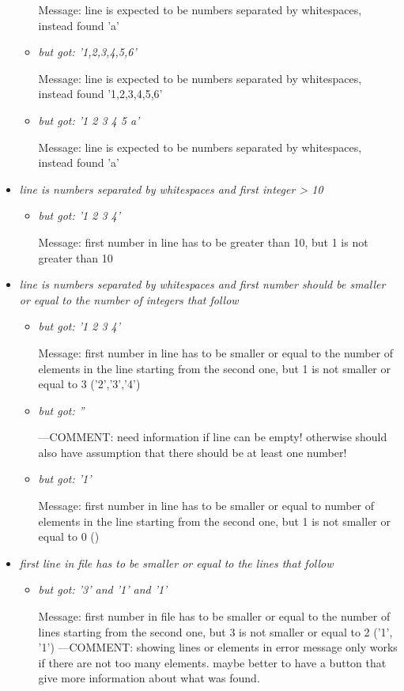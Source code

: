 \documentclass[11pt]{article}
\begin{document}
\begin{itemize}
\begin{itemize}
Message: line is expected to be numbers separated by whitespaces, instead found 'a'

\item \textit{but got: '1,2,3,4,5,6'}

Message: line is expected to be numbers separated by whitespaces, instead found '1,2,3,4,5,6'

\item \textit{but got: '1 2 3 4 5 a'}

Message: line is expected to be numbers separated by whitespaces, instead found 'a'
\end{itemize}

\item \textit{line is numbers separated by whitespaces and first integer > 10}
\begin{itemize}

\item \textit{but got: '1 2 3 4'}

Message: first number in line has to be greater than 10, but 1 is not greater than 10
\end{itemize}

\item \textit{line is numbers separated by whitespaces and first number should be smaller or equal to the number of integers that follow}
\begin{itemize}

\item \textit{but got: '1 2 3 4'}

Message: first number in line has to be smaller or equal to the number of elements in the line starting from the second one, but 1 is not smaller or equal to 3 ('2','3','4')

\item \textit{but got: ''}

---COMMENT: need information if line can be empty! otherwise should also have assumption that there should be at least one number!

\item \textit{but got: '1'}

Message: first number in line has to be smaller or equal to number of elements in the line starting from the second one, but 1 is not smaller or equal to 0 ()
\end{itemize}

\item \textit{first line in file has to be smaller or equal to the lines that follow}
\begin{itemize}

\item \textit{but got: '3' and '1' and '1'}

Message: first number in file has to be smaller or equal to the number of lines starting from the second one, but 3 is not smaller or equal to 2 ('1', '1')
---COMMENT: showing lines or elements in error message only works if there are not too many elements. maybe better to have a button that give more information about what was found.
\end{itemize}

\end{itemize}
\end{document}
